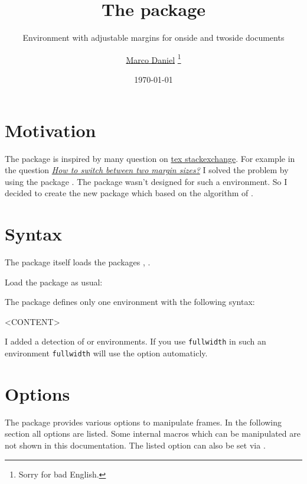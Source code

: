 \documentclass[parskip=false,english,11pt]{ltxmdf}
\title{The \fwdname package}
\subtitle{Environment with adjustable margins for onside and twoside documents}
\author{\href{mailto:marco.daniel@mada-nada.de}{Marco Daniel}%
       \footnote{Sorry for bad English.}}
\date{\today}
\def\fwdname{\texttt{fullwidth}\xspace}
\begin{document}
\maketitle

\section{Motivation}
The package is inspired by many question on \href{http://tex.stackexchange.com/}{tex stackexchange}. For example in the question \href{http://tex.stackexchange.com/questions/34368/how-to-switch-between-two-margin-sizes}{\emph{How to switch between two margin sizes?}} I solved the problem by using the package \mdname. The package wasn't designed for such a environment. So I decided to create the new package which based on the algorithm of \mdname.



\section{Syntax}\label{sec:syntax}
The package itself loads the packages , .

Load the package as usual:
\begin{mdexample}
 \usepackage[<GLOBAL OPTIONS>]{fullwidth}
\end{mdexample}

The package defines only one environment with the following syntax:
\begin{mdexample}
 \begin{fullwidth}
    <CONTENT>
 \end{fullwidth}
\end{mdexample}


I added a detection of  or  environments. If you use \fwdname in such an environment \fwdname will use the option  automaticly. 


\section{Options}
The package provides various options to manipulate frames. In the following section all options are listed. Some internal macros which can be manipulated are not shown in this documentation.
The listed option can also be set via .
\end{document}
